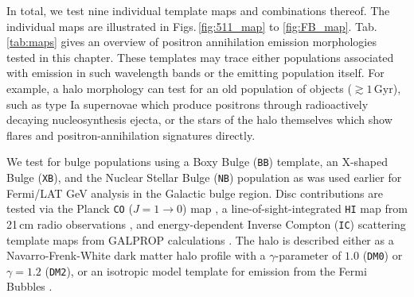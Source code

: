 \documentclass[doublespace,nopageskip]{VTthesis} %
\newcommand{\mrm}[1]{\mathrm{#1}}
\begin{document}
%



In total, we test nine individual template maps and combinations thereof. 
%
The individual maps are illustrated in Figs.\,\ref{fig:511_map} to \ref{fig:FB_map}. Tab.\,\ref{tab:maps} gives an overview of positron annihilation emission morphologies tested in this chapter.
%
These templates may trace either populations associated with emission in such wavelength bands or the emitting population itself.
%
For example, a halo morphology can test for an old population of objects ($\gtrsim 1\,\mrm{Gyr}$), such as type Ia supernovae which produce positrons through radioactively decaying nucleosynthesis ejecta, or the stars of the halo themselves which show flares and positron-annihilation signatures directly.

We test for bulge populations using a Boxy Bulge (\texttt{BB}) template, an X-shaped Bulge (\texttt{XB}), and the Nuclear Stellar Bulge (\texttt{NB}) population as was used earlier \cite[e.g., ][]{Macias2018_LATGeV,Bartels2018_GeVexcess_stars} for Fermi/LAT GeV analysis in the Galactic bulge region.
%
Disc contributions are tested via the Planck \texttt{CO} ($J=1 \rightarrow 0$) map \citep{Planck2016_foregrounds}, a line-of-sight-integrated \texttt{HI} map from 21\,cm radio observations \citep{Dickey1990_HI}, and energy-dependent Inverse Compton (\texttt{IC}) scattering template maps from GALPROP calculations \citep{Strong2007_GALPROP}.
%
The halo is described either as a Navarro-Frenk-White \citep{Navarro1997_NFW} dark matter halo profile with a $\gamma$-parameter of $1.0$ (\texttt{DM0}) or $\gamma=1.2$ (\texttt{DM2}), or an isotropic model template for emission from the Fermi Bubbles \citep[\texttt{FB}][]{Su2010_fermibubbles}.
\end{document}
